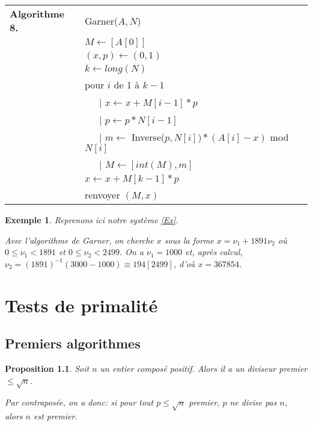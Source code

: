 \documentclass[12pt]{report}
\newtheorem*{ex}{Exemple}
\newtheorem{Prop}[thm]{Proposition}
\begin{document}
\begin{tabular}{ll}
\textbf{Algorithme 8.} & Garner($A,N$)\\
           & $M \leftarrow  [A[0]]$ \\
           & $(x,p)\leftarrow (0,1) $ \\
           & $ k \leftarrow long(N) $    \\
           & pour $i$ de 1 à $k-1$ \\
           & \ \ \ {\rm | } $ x \leftarrow x+M[i-1]*p $  \\
           & \ \ \ {\rm | } $p \leftarrow p*N[i-1] $ \\
           & \ \ \ {\rm | } $ m \leftarrow $ Inverse($p,N[i])*(A[i]-x) $ mod $N[i]$\\ 
           & \ \ \ {\rm | } $M \leftarrow  [int(M),m ] $  \\
           & $x \leftarrow x + M[k-1]*p$ \\    
           &  renvoyer $(M,x)$ 
\end{tabular}

\begin{ex}
Reprenons ici notre système \eqref{Ex}. \par 
Avec l'algorithme de Garner, on cherche $x$ sous la forme $x=\nu_1 +1891 \nu_2 $ où $0 \leq \nu_1 < 1891$ et $0 \leq \nu_2 < 2499$. On a $\nu_1=1000$ et, après calcul, $\nu_2=(1891)^{-1}(3000-1000)\equiv 194 [2499]$, d'où $x=367854$.
\end{ex}

\chapter{Tests de primalité}


\section{Premiers algorithmes}








\begin{Prop}
Soit $n$ un entier composé positif. Alors il a un diviseur premier $\leq \sqrt{n}$.\par 
Par contraposée, on a donc: si pour tout $p \leq \sqrt{n}$ premier, $p$ ne divise pas $n$, alors $n$ est premier.
\end{Prop}
\end{document}
